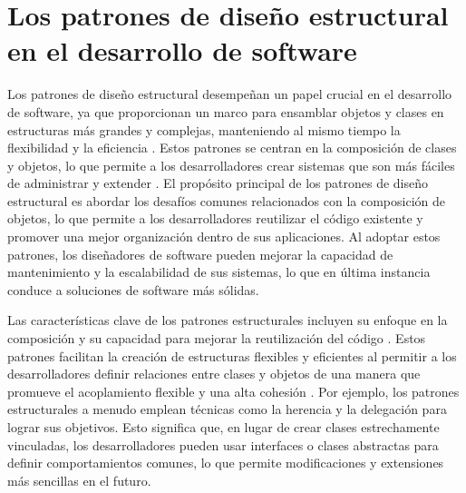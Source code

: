 \documentclass[12pt]{article}
\begin{document}
\section*{Los patrones de diseño estructural en el desarrollo de software}
Los patrones de diseño estructural desempeñan un papel crucial en el desarrollo de software, ya que proporcionan un marco para ensamblar objetos y clases en estructuras más grandes y complejas, manteniendo al mismo tiempo la flexibilidad y la eficiencia \cite{ref1}. Estos patrones se centran en la composición de clases y objetos, lo que permite a los desarrolladores crear sistemas que son más fáciles de administrar y extender \cite{ref2}. El propósito principal de los patrones de diseño estructural es abordar los desafíos comunes relacionados con la composición de objetos, lo que permite a los desarrolladores reutilizar el código existente y promover una mejor organización dentro de sus aplicaciones. Al adoptar estos patrones, los diseñadores de software pueden mejorar la capacidad de mantenimiento y la escalabilidad de sus sistemas, lo que en última instancia conduce a soluciones de software más sólidas.

Las características clave de los patrones estructurales incluyen su enfoque en la composición y su capacidad para mejorar la reutilización del código \cite{ref1}. Estos patrones facilitan la creación de estructuras flexibles y eficientes al permitir a los desarrolladores definir relaciones entre clases y objetos de una manera que promueve el acoplamiento flexible y una alta cohesión \cite{ref2}. Por ejemplo, los patrones estructurales a menudo emplean técnicas como la herencia y la delegación para lograr sus objetivos. Esto significa que, en lugar de crear clases estrechamente vinculadas, los desarrolladores pueden usar interfaces o clases abstractas para definir comportamientos comunes, lo que permite modificaciones y extensiones más sencillas en el futuro.
\end{document}
